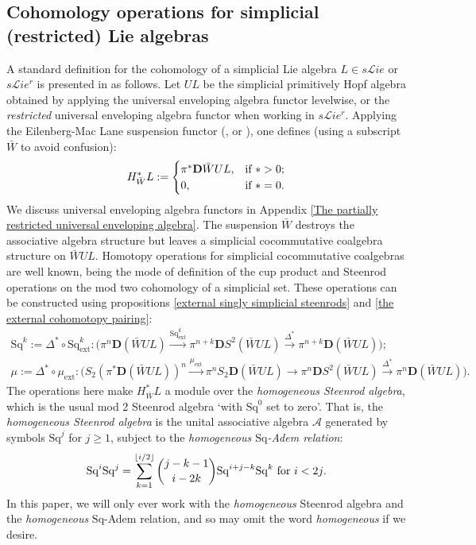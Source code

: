 \documentclass[11pt]{amsart} \renewcommand{\baselinestretch}{1.4}
\theoremstyle{plain}
\theoremstyle{definition}
\renewcommand{\to}{\longrightarrow}
\newcommand{\scrL}{\mathscr{L}}
\newcommand{\calA}{\mathcal{A}}
\newcommand{\citeBOX}[2][]{\cite[\mbox{#1}]{#2}}
\newcommand{\ExtCohOp}{\mathrm{Sq}_\mathrm{ext}}
\newcommand{\ExtCohProd}{\mu_\mathrm{ext}}
\newcommand{\Sq}{\mathrm{Sq}}
\newcommand{\LieSteen}{\calA}
\newcommand{\liealgs}{{\scrL\!\textit{ie}}}
\newcommand{\restliealgs}{{\scrL\!\textit{ie}^\textit{r}}}
\newcommand{\dual}{\mathbf{D}}
\begin{document}
\begin{Constructing cohomology operations}
\subsection{Cohomology operations for simplicial (restricted) Lie algebras}
\label{section: Cohomology operations for simplicial (restricted) Lie algebras}
A standard definition for the cohomology of a simplicial Lie algebra $L\in s\liealgs$ or $s\restliealgs$ is presented in \cite{PriddySimplicialLie.pdf} as follows. Let $UL$ be the simplicial primitively Hopf algebra obtained by applying the universal enveloping algebra functor levelwise, or the \emph{restricted} universal enveloping algebra functor when working in $s\restliealgs$. %
Applying the Eilenberg-Mac Lane suspension functor (\citeBOX[\S2.3]{PriddySimplicialLie.pdf}, \citeBOX[\S5]{MillerSullivanConjecture.pdf} or \citeBOX[p.~87]{MaySimpObj.pdf}), one defines (using a subscript $\bar{W}$ to avoid confusion):
\[H_{\bar{W}}^*L:=\begin{cases}
\pi^*\dual\bar{W}UL,&\textup{if }*>0;\\
0,&\textup{if }*=0.
\end{cases}\]
We discuss universal enveloping algebra functors in Appendix \ref{The partially restricted universal enveloping algebra}.
The suspension $\bar{W}$ destroys the associative algebra structure but leaves a simplicial cocommutative coalgebra structure on $\bar{W}UL$. Homotopy operations for simplicial cocommutative coalgebras are well known, being the mode of definition of the cup product and Steenrod operations on the mod two cohomology of a simplicial set. These operations can be constructed using  propositions \ref{external singly simplicial steenrods} and \ref{the external cohomotopy pairing}:
\begin{gather*}
\Sq^k:=\Delta^*\circ\ExtCohOp^k:\bigl(\pi^n\dual (\bar{W}UL)\overset{\ExtCohOp^k}{\to}\pi^{n+k}\dual S^2(\bar{W}UL)\overset{\Delta^*}{\to}\pi^{n+k}\dual (\bar{W}UL)\bigr);\\
\mu:=\Delta^*\circ\ExtCohProd:\bigl(S_2(\pi^*\dual(\bar{W}UL))^{n}\overset{\ExtCohProd}{\to} \pi^nS_2\dual(\bar{W}UL)\to \pi^n\dual S^2(\bar{W}UL)\overset{\Delta^*}{\to}\pi^n\dual (\bar{W}UL)\bigr).
\end{gather*}
The operations here make $H^*_{\bar{W}}L$ a module over the \emph{homogeneous Steenrod algebra}, which is the usual mod 2 Steenrod algebra `with $\Sq^0$ set to zero'. That is, the \emph{homogeneous Steenrod algebra} is the unital associative algebra $\LieSteen$ generated by symbols $\Sq^j$ for $j\geq1$, subject to the \emph{homogeneous $\Sq$-Adem relation}:
\[\Sq^i\Sq^j=\sum_{k=1}^{\lfloor i/2\rfloor}{j-k-1\choose i-2k}\Sq^{i+j-k}\Sq^k\textup{\ for $i<2j$.}\]
In this paper, we will only ever work with the \emph{homogeneous} Steenrod algebra and the \emph{homogeneous} $\Sq$-Adem relation, and so may omit the word \emph{homogeneous} if we desire.


\end{Constructing cohomology operations}
\end{document}
